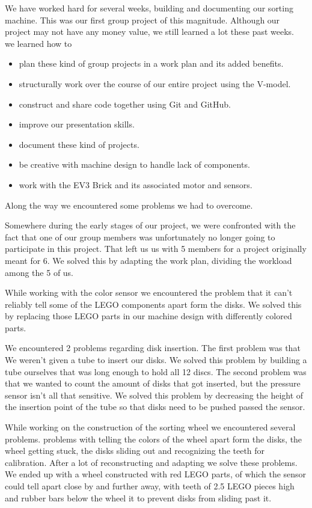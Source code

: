 We have worked hard for several weeks, building and documenting our sorting machine. This was our first group project of this magnitude. Although our project may not have any money value, we still learned a lot these past weeks.\\

we learned how to
\begin{itemize}
\item plan these kind of group projects in a work plan and its added benefits.
\item structurally work over the course of our entire project using the V-model.
\item construct and share code together using Git and GitHub.
\item improve our presentation skills.
\item document these kind of projects.
\item be creative with machine design to handle lack of components.
\item work with the EV3 Brick and its associated motor and sensors.
\end{itemize}


Along the way we encountered some problems we had to overcome.


Somewhere during the early stages of our project, we were confronted with the fact that one of our group members was unfortunately no longer going to participate in this project. That left us us with 5 members for a project originally meant for 6. We solved this by adapting the work plan, dividing the workload among the 5 of us.


While working with the color sensor we encountered the problem that it can't reliably tell some of the LEGO components apart form the disks. We solved this by replacing those LEGO parts in our machine design with differently colored parts.


We encountered 2 problems regarding disk insertion.
The first problem was that We weren't given a tube to insert our disks. We solved this problem by building a tube ourselves that was long enough to hold all 12 discs.
The second problem was that we wanted to count the amount of disks that got inserted, but the pressure sensor isn't all that sensitive. We solved this problem by decreasing the height of the insertion point of the tube so that disks need to be pushed passed the sensor.


While working on the construction of the sorting wheel we encountered several problems. problems with telling the colors of the wheel apart form the disks, the wheel getting stuck, the disks sliding out and recognizing the teeth for calibration. After a lot of reconstructing and adapting we solve these problems. We ended up with a wheel constructed with red LEGO parts, of which the sensor could tell apart close by and further away, with teeth of 2.5 LEGO pieces high and rubber bars below the wheel it to prevent disks from sliding past it.


